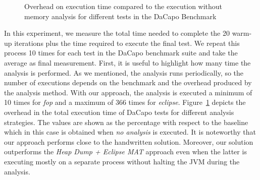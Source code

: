 \begin{figure}[!ht]
\centering
{}
\caption{Overhead on execution time compared to the execution without memory analysis for different tests in the DaCapo Benchmark\label{fig:evaluationTotalTime}}
\end{figure}

In this experiment, we measure the total time needed to complete the 20 warm-up iterations plus the time required to execute the final test.
We repeat this process 10 times for each test in the DaCapo benchmark suite and take the average as final measurement.
First, it is useful to highlight how many time the analysis is performed.
As we mentioned, the analysis runs periodically, so the number of executions depends on the benchmark and the overhead produced by the analysis method.
With our approach, the analysis is executed a minimum of 10 times for \textit{fop} and a maximum of  366 times for \textit{eclipse}.
Figure~\ref{fig:evaluationTotalTime} depicts the overhead in the total execution time of DaCapo tests for different analysis strategies.
The values are shown as the percentage with respect to the baseline which in this case is obtained when \textit{no analysis} is executed.
It is noteworthy that our approach performs close to the handwritten solution.
Moreover, our solution outperforms the \textit{Heap Dump + Eclipse MAT} approach even when the latter is executing mostly on a separate process without halting the JVM during the analysis.

